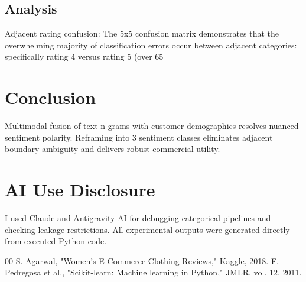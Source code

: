 \documentclass[conference]{IEEEtran}
\begin{document}
\subsection{Analysis}
Adjacent rating confusion: The 5x5 confusion matrix demonstrates that the overwhelming majority of classification errors occur between adjacent categories: specifically rating 4 versus rating 5 (over 65%

\section{Conclusion}
Multimodal fusion of text n-grams with customer demographics resolves nuanced sentiment polarity. Reframing into 3 sentiment classes eliminates adjacent boundary ambiguity and delivers robust commercial utility.

\section*{AI Use Disclosure}
I used Claude and Antigravity AI for debugging categorical pipelines and checking leakage restrictions. All experimental outputs were generated directly from executed Python code.

\begin{thebibliography}{00}
 S. Agarwal, "Women’s E-Commerce Clothing Reviews," Kaggle, 2018.
 F. Pedregosa et al., "Scikit-learn: Machine learning in Python," JMLR, vol. 12, 2011.
\end{thebibliography}
\end{document}
